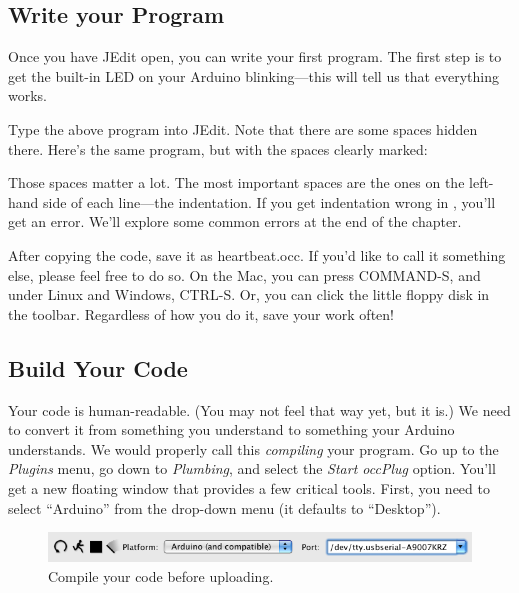 \afterpage{\clearpage}

\subsection{Write your Program}
Once you have JEdit open, you can write your first program. The first step is to get the built-in LED on your Arduino blinking---this will tell us that everything works. 



Type the above program into JEdit. Note that there are some spaces hidden there. Here's the same program, but with the spaces clearly marked:



Those {\strong spaces matter a lot}. The most important spaces are the ones on the left-hand side of each line---the {\strong indentation}. If you get indentation wrong in \occam, you'll get an error. We'll explore some common errors at the end of the chapter. 

After copying the code, save it as {\code heartbeat.occ}. If you'd like to call it something else, please feel free to do so. On the Mac, you can press COMMAND-S, and under Linux and Windows, CTRL-S. Or, you can click the little floppy disk in the toolbar. Regardless of how you do it, save your work often!


\subsection{Build Your Code}
Your code is human-readable. (You may not feel that way yet, but it is.) We need to convert it from something you understand to something your Arduino understands. We would properly call this {\em compiling} your program. Go up to the {\em Plugins} menu, go down to {\em Plumbing}, and select the {\em Start occPlug} option. You'll get a new floating window that provides a few critical tools. First, you need to select ``Arduino'' from the drop-down menu (it defaults to ``Desktop'').

\begin{figure}[ht]
  \begin{center}
    \includegraphics[width=1.0\linewidth]{screenshots/20100108-compile-button}
    \caption{Compile your code before uploading.}
    \label{screenshot:compile-button}
  \end{center}
\end{figure}

